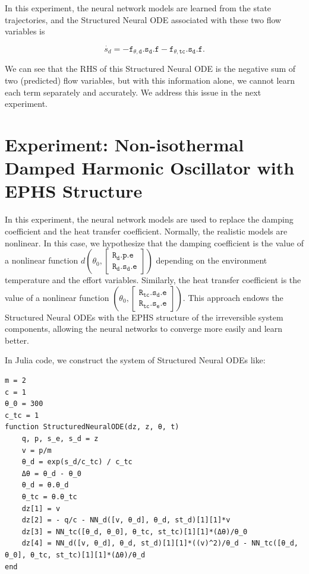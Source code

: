 \documentclass[
	parskip, 			   %
	twoside, 			   %
	DIV=14, 			   %
	BCOR=15.0mm, 		   %
	headsepline, 		   %
	open=right, 		   %
	captions=tableheading, %
	bibliography=totoc,    %
	numbers=noenddot       %
]{scrreprt}
\begin{document}
In this experiment, the neural network models are learned from the state trajectories, and the Structured Neural ODE associated with these two flow variables is

\begin{equation}
    \label{eq:NeuralODE_ndho_EPHS_last_line}
    \dot{s_d} = -\mathtt{f_{\theta, d}.s_{d}.f}-\mathtt{f_{\theta, tc}.s_{d}.f}.
\end{equation}

We can see that the RHS of this Structured Neural ODE is the negative sum of two (predicted) flow variables, but with this information alone, we cannot learn each term separately and accurately. We address this issue in the next experiment.

\clearpage
\section{Experiment: Non-isothermal Damped Harmonic Oscillator with EPHS Structure}
In this experiment, the neural network models are used to replace the damping coefficient and the heat transfer coefficient. Normally, the realistic models are nonlinear. In this case, we hypothesize that the damping coefficient is the value of a nonlinear function $d \left( \theta_0, \left[\begin{array}{l}\mathtt{R_{d}.p.e} \\ \mathtt{R_{d}.s_{d}.e}\end{array}\right] \right)$ depending on the environment temperature and the effort variables. Similarly, the heat transfer coefficient is the value of a nonlinear function $\left( \theta_0, \left[\begin{array}{l} \mathtt{R_{tc}.s_{d}.e} \\ \mathtt{R_{tc}.s_{e}.e}\end{array}\right] \right)$. This approach endows the Structured Neural ODEs with the EPHS structure of the irreversible system components, allowing the neural networks to converge more easily and learn better.

In Julia code, we construct the system of Structured Neural ODEs like:

\begin{verbatim}
m = 2
c = 1
θ_0 = 300
c_tc = 1
function StructuredNeuralODE(dz, z, θ, t)
    q, p, s_e, s_d = z
    v = p/m
    θ_d = exp(s_d/c_tc) / c_tc
    Δθ = θ_d - θ_0
    θ_d = θ.θ_d
    θ_tc = θ.θ_tc   
    dz[1] = v
    dz[2] = - q/c - NN_d([v, θ_d], θ_d, st_d)[1][1]*v
    dz[3] = NN_tc([θ_d, θ_0], θ_tc, st_tc)[1][1]*(Δθ)/θ_0
    dz[4] = NN_d([v, θ_d], θ_d, st_d)[1][1]*((v)^2)/θ_d - NN_tc([θ_d, θ_0], θ_tc, st_tc)[1][1]*(Δθ)/θ_d
end
\end{verbatim}
\end{document}
